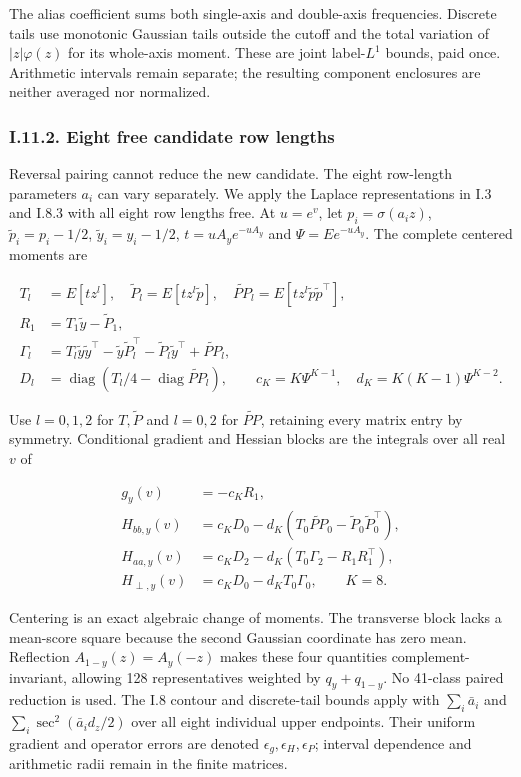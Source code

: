 \documentclass{article}
\begin{document}
The alias coefficient sums both single-axis and double-axis frequencies.
Discrete tails use monotonic Gaussian tails outside the cutoff and the
total variation of \(|z|\varphi(z)\) for its whole-axis moment. These
are joint label-\(L^1\) bounds, paid once. Arithmetic intervals remain
separate; the resulting component enclosures are neither averaged nor
normalized.

\subsubsection*{I.11.2. Eight free candidate row
lengths}\label{i.11.2.-eight-free-candidate-row-lengths}

Reversal pairing cannot reduce the new candidate. The eight row-length
parameters \(a_i\) can vary separately. We apply the Laplace
representations in I.3 and I.8.3 with all eight row lengths free. At
\(u=e^v\), let \(p_i=\sigma(a_i z)\), \(\widetilde p_i=p_i-1/2\),
\(\widetilde y_i=y_i-1/2\), \(t=uA_y e^{-uA_y}\) and
\(\Psi=E e^{-uA_y}\). The complete centered moments are

\[
\begin{aligned}
T_l&=E[tz^l],\quad \widetilde P_l=E[tz^l\widetilde p],\quad
\widetilde{PP}_l=E[tz^l\widetilde p\widetilde p^\top],\\
R_1&=T_1\widetilde y-\widetilde P_1,\\
\Gamma_l&=T_l\widetilde y\widetilde y^\top
-\widetilde y\widetilde P_l^\top-\widetilde P_l\widetilde y^\top
+\widetilde{PP}_l,\\
D_l&=\operatorname{diag}(T_l/4-\operatorname{diag}\widetilde{PP}_l),\qquad
c_K=K\Psi^{K-1},\quad d_K=K(K-1)\Psi^{K-2}.
\end{aligned}
\tag{I.58}
\]

Use \(l=0,1,2\) for \(T,\widetilde P\) and \(l=0,2\) for
\(\widetilde{PP}\), retaining every matrix entry by symmetry.
Conditional gradient and Hessian blocks are the integrals over all real
\(v\) of

\[
\begin{aligned}
g_y(v)&=-c_KR_1,\\
H_{bb,y}(v)&=c_KD_0-d_K(T_0\widetilde{PP}_0-\widetilde P_0\widetilde P_0^\top),\\
H_{aa,y}(v)&=c_KD_2-d_K(T_0\Gamma_2-R_1R_1^\top),\\
H_{\perp,y}(v)&=c_KD_0-d_KT_0\Gamma_0,\qquad K=8.
\end{aligned}
\tag{I.59}
\]

Centering is an exact algebraic change of moments. The transverse block
lacks a mean-score square because the second Gaussian coordinate has
zero mean. Reflection \(A_{1-y}(z)=A_y(-z)\) makes these four quantities
complement-invariant, allowing 128 representatives weighted by
\(q_y+q_{1-y}\). No 41-class paired reduction is used. The I.8 contour
and discrete-tail bounds apply with \(\sum_i\bar a_i\) and
\(\sum_i\sec^2(\bar a_i d_z/2)\) over all eight individual upper
endpoints. Their uniform gradient and operator errors are denoted
\(\epsilon_g,\epsilon_H,\epsilon_P\); interval dependence and arithmetic
radii remain in the finite matrices.
\end{document}
